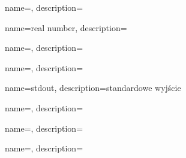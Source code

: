 {
  name={\PLph},
  description={\PLph}
}

{
  name={real number},
  description={\PLph}
}

{
  name={\PLph},
  description={\PLph}
}

{
  name={\PLph},
  description={\PLph}
}

{
  name={stdout},
  description={standardowe wyjście}
}

{
  name={\PLph},
  description={\PLph}
}

{
  name={\PLph},
  description={\PLph}
}

{
  name={\PLph},
  description={\PLph}
}

